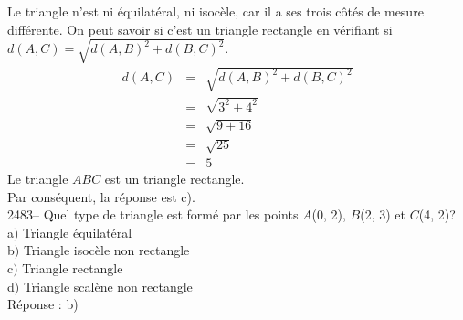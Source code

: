 \documentclass[letterpaper, 12pt]{article}
\begin{document}
Le triangle n'est ni \'equilat\'eral, ni isoc\`ele, car il a ses trois c\^ot\'es de mesure diff\'erente. On peut savoir si c'est un triangle rectangle en v\'erifiant si $d(A, C)=\sqrt{d(A, B)^{2}+d(B, C)^{2}}$.
\begin{eqnarray*}
 d(A, C)&=&\sqrt{d(A, B)^{2}+d(B, C)^{2}}\\
&=&\sqrt{3^{2}+4^{2}}\\
&=&\sqrt{9+16}\\
&=&\sqrt{25}\\
&=&5
\end{eqnarray*}
Le triangle $ABC$ est un triangle rectangle.\\
Par cons\'equent, la r\'eponse est c).\\

2483-- Quel type de triangle est form\'e par les points $A$(0, 2), $B$(2, 3) et $C$(4, 2)?\\

a$)$ Triangle \'equilat\'eral\\
b$)$ Triangle isoc\`ele non rectangle\\
c$)$ Triangle rectangle\\
d$)$ Triangle scal\`ene non rectangle\\

R\'eponse : b)\\
\end{document}
